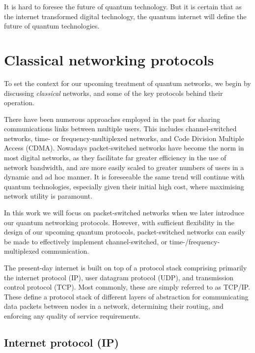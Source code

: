 \documentclass[aps,rmp,twocolumn,amsmath,amssymb,nofootinbib,superscriptaddress,longbibliography,floatfix]{revtex4-1}
\begin{document}
It is hard to foresee the future of quantum technology. But it is certain that as the internet transformed digital technology, the quantum internet will define the future of quantum technologies.

%
%

\section{Classical networking protocols}

To set the context for our upcoming treatment of quantum networks, we begin by discussing \emph{classical} networks, and some of the key protocols behind their operation.

There have been numerous approaches employed in the past for sharing communications links between multiple users. This includes channel-switched networks, time- or frequency-multiplexed networks, and Code Division Multiple Access (CDMA). Nowadays packet-switched networks have become the norm in most digital networks, as they facilitate far greater efficiency in the use of network bandwidth, and are more easily scaled to greater numbers of users in a dynamic and ad hoc manner. It is foreseeable the same trend will continue with quantum technologies, especially given their initial high cost, where maximising network utility is paramount.

In this work we will focus on packet-switched networks when we later introduce our quantum networking protocols. However, with sufficient flexibility in the design of our upcoming quantum protocols, packet-switched networks can easily be made to effectively implement channel-switched, or time-/frequency-multiplexed communication.

The present-day internet is built on top of a protocol stack comprising primarily the internet protocol (IP), user datagram protocol (UDP), and transmission control protocol (TCP). Most commonly, these are simply referred to as TCP/IP. These define a protocol stack of different layers of abstraction for communicating data packets between nodes in a network, determining their routing, and enforcing any quality of service requirements.

%
%

\subsection{Internet protocol (IP)}
\end{document}
